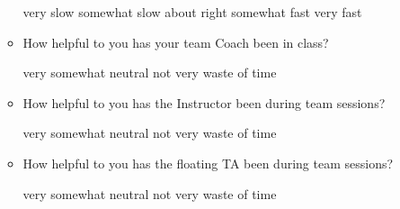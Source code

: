 \documentclass[handout]{mcs}
\begin{document}
\begin{itemize}
\begin{itemize}
\begin{center}
very slow\hspace{0.3in} somewhat slow\hspace{0.3in} about
right\hspace{0.3in} somewhat fast\hspace{0.3in} very fast
\end{center}

\item How helpful to you has your team Coach been in class?

\begin{center}
very\hspace{0.5in} somewhat \hspace{0.5in} neutral\hspace{0.5in} not
very \hspace{0.5in} waste of time
\end{center}

\item How helpful to you has the Instructor been during team sessions?

\begin{center}
very\hspace{0.5in} somewhat \hspace{0.5in} neutral\hspace{0.5in} not
very \hspace{0.5in} waste of time
\end{center}

\item How helpful to you has the floating TA been during team sessions?

\begin{center}
very\hspace{0.5in} somewhat \hspace{0.5in} neutral\hspace{0.5in} not
very \hspace{0.5in} waste of time
\end{center}




\end{itemize}
\end{itemize}
\end{document}
